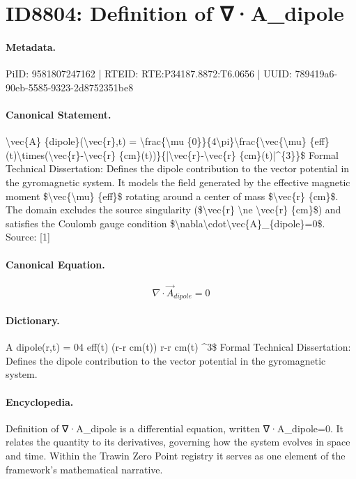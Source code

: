 \section*{ID8804: Definition of ∇·A\_dipole}
\paragraph{Metadata.}
PiID: 9581807247162 | RTEID: RTE:P34187.8872:T6.0656 | UUID: 789419a6-90eb-5585-9323-2d8752351be8

\paragraph{Canonical Statement.}
\textbackslash{}vec\{A\} \{dipole\}(\textbackslash{}vec\{r\},t) = \textbackslash{}frac\{\textbackslash{}mu \{0\}\}\{4\textbackslash{}pi\}\textbackslash{}frac\{\textbackslash{}vec\{\textbackslash{}mu\} \{eff\}(t)\textbackslash{}times(\textbackslash{}vec\{r\}-\textbackslash{}vec\{r\} \{cm\}(t))\}\{|\textbackslash{}vec\{r\}-\textbackslash{}vec\{r\} \{cm\}(t)|\textasciicircum{}\{3\}\}\$ Formal Technical Dissertation: Defines the dipole contribution to the vector potential in the gyromagnetic system. It models the field generated by the effective magnetic moment \$\textbackslash{}vec\{\textbackslash{}mu\} \{eff\}\$ rotating around a center of mass \$\textbackslash{}vec\{r\} \{cm\}\$. The domain excludes the source singularity (\$\textbackslash{}vec\{r\} \textbackslash{}ne \textbackslash{}vec\{r\} \{cm\}\$) and satisfies the Coulomb gauge condition \$\textbackslash{}nabla\textbackslash{}cdot\textbackslash{}vec\{A\}\_\{dipole\}=0\$. Source: [1]

\paragraph{Canonical Equation.}
\[
\nabla\cdot\vec{A}_{dipole}=0
\]

\paragraph{Dictionary.}
A dipole(r,t) = 04 eff(t) (r-r cm(t)) r-r cm(t) \textasciicircum{}3\$ Formal Technical Dissertation: Defines the dipole contribution to the vector potential in the gyromagnetic system.

\paragraph{Encyclopedia.}
Definition of ∇·A\_dipole is a differential equation, written ∇·A\_dipole=0. It relates the quantity to its derivatives, governing how the system evolves in space and time. Within the Trawin Zero Point registry it serves as one element of the framework's mathematical narrative.
